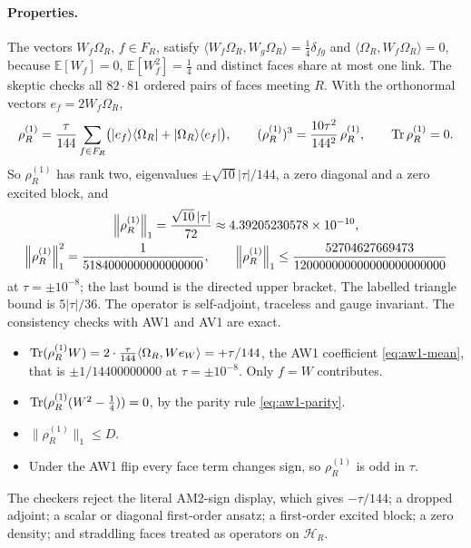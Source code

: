 \paragraph{Properties.}
The vectors $W_f\Omega_R$, $f\in F_R$, satisfy
$\langle W_f\Omega_R,W_g\Omega_R\rangle=\tfrac14\delta_{fg}$ and
$\langle\Omega_R,W_f\Omega_R\rangle=0$, because $\mathbb E[W_f]=0$,
$\mathbb E[W_f^2]=\tfrac14$ and distinct faces share at most one link. The
skeptic checks all $82\cdot81$ ordered pairs of faces meeting $R$. With the
orthonormal vectors $e_f=2W_f\Omega_R$,
\begin{equation}
 \rho^{(1)}_R=\frac\tau{144}\sum_{f\in F_R}\bigl(|e_f\rangle\langle\Omega_R|
 +|\Omega_R\rangle\langle e_f|\bigr),
 \qquad(\rho^{(1)}_R)^3=\frac{10\tau^2}{144^2}\,\rho^{(1)}_R,\qquad
 \operatorname{Tr}\rho^{(1)}_R=0 .
 \label{eq:ay1-rho1-basis}
\end{equation}
So $\rho^{(1)}_R$ has rank two, eigenvalues $\pm\sqrt{10}|\tau|/144$, a zero
diagonal and a zero excited block, and
\begin{equation}
 \begin{gathered}
 \left\lVert\rho^{(1)}_R\right\rVert_1=\frac{\sqrt{10}\,|\tau|}{72}
 \approx4.39205230578\times10^{-10},\\
 \left\lVert\rho^{(1)}_R\right\rVert_1^2=\frac1{5184000000000000000},\qquad
 \left\lVert\rho^{(1)}_R\right\rVert_1\le\frac{52704627669473}{120000000000000000000000}
 \end{gathered}
 \label{eq:ay1-rho1-norm}
\end{equation}
at $\tau=\pm10^{-8}$; the last bound is the directed upper bracket. The
labelled triangle bound is $5|\tau|/36$. The operator is self-adjoint, traceless and gauge invariant.
The consistency checks with AW1 and AV1 are exact.
\begin{itemize}
\item $\operatorname{Tr}(\rho^{(1)}_RW)=2\cdot\tfrac\tau{144}\langle\Omega_R,We_W\rangle
 =+\tau/144$, the AW1 coefficient \eqref{eq:aw1-mean}, that is
 $\pm1/14400000000$ at $\tau=\pm10^{-8}$. Only $f=W$ contributes.
\item $\operatorname{Tr}(\rho^{(1)}_R(W^2-\tfrac14))=0$, by the parity rule
 \eqref{eq:aw1-parity}.
\item $\lVert \rho^{(1)}_R\rVert_1\le D$.
\item Under the AW1 flip every face term changes sign, so $\rho^{(1)}_R$ is
 odd in $\tau$.
\end{itemize}
The checkers reject the literal AM2-sign display, which gives $-\tau/144$; a
dropped adjoint; a scalar or diagonal first-order ansatz; a first-order
excited block; a zero density; and straddling faces treated as operators on
$\mathcal H_R$.


